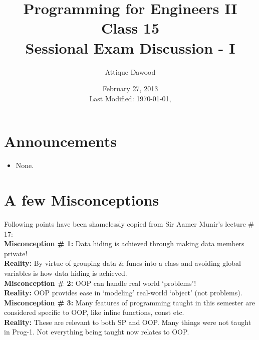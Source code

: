 \documentclass[12pt,a4paper]{article}
\title{\vspace{-2cm}Programming for Engineers II\\Class 15\\Sessional Exam Discussion - I}
\author{Attique Dawood}
\date{February 27, 2013\\[0.2cm] Last Modified: \today, \currenttime}
\begin{document}
\maketitle
\section{Announcements}
\begin{itemize}
\item None.
\end{itemize}
\section{A few Misconceptions}
Following points have been shamelessly copied from Sir Aamer Munir's lecture \# 17:\\
\noindent\textbf{Misconception \# 1:} Data hiding is achieved through making data members private!\\
\noindent\textbf{Reality:} By virtue of grouping data \& funcs into a class and avoiding global variables is how data hiding is achieved.\\
\noindent\textbf{Misconception \# 2:} OOP can handle real world ‘problems’!\\
\noindent\textbf{Reality:} OOP provides ease in ‘modeling’ real-world ‘object’ (not problems).\\
\noindent\textbf{Misconception \# 3:} Many features of programming taught in this semester are considered specific to OOP, like inline functions, const etc.\\
\noindent\textbf{Reality:} These are relevant to both SP and OOP. Many things were not taught in Prog-1. Not everything being taught now relates to OOP.\\


\end{document}
